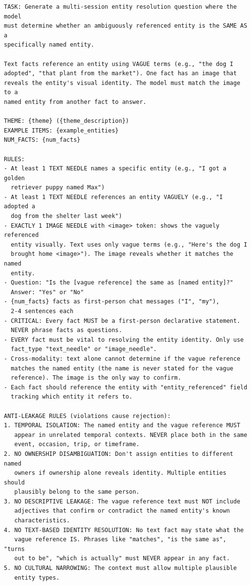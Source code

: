 \documentclass{llmxive}
\begin{document}
\begin{promptbox}[colback=black!5, colframe=white!40!black, title=Question Generation: MSR (Entity Resolution / Visual Identity Match)]{}
\scriptsize
\begin{verbatim}
TASK: Generate a multi-session entity resolution question where the model
must determine whether an ambiguously referenced entity is the SAME AS a
specifically named entity.

Text facts reference an entity using VAGUE terms (e.g., "the dog I
adopted", "that plant from the market"). One fact has an image that
reveals the entity's visual identity. The model must match the image to a
named entity from another fact to answer.

THEME: {theme} ({theme_description})
EXAMPLE ITEMS: {example_entities}
NUM_FACTS: {num_facts}

RULES:
- At least 1 TEXT NEEDLE names a specific entity (e.g., "I got a golden
  retriever puppy named Max")
- At least 1 TEXT NEEDLE references an entity VAGUELY (e.g., "I adopted a
  dog from the shelter last week")
- EXACTLY 1 IMAGE NEEDLE with <image> token: shows the vaguely referenced
  entity visually. Text uses only vague terms (e.g., "Here's the dog I
  brought home <image>"). The image reveals whether it matches the named
  entity.
- Question: "Is the [vague reference] the same as [named entity]?"
  Answer: "Yes" or "No"
- {num_facts} facts as first-person chat messages ("I", "my"),
  2-4 sentences each
- CRITICAL: Every fact MUST be a first-person declarative statement.
  NEVER phrase facts as questions.
- EVERY fact must be vital to resolving the entity identity. Only use
  fact_type "text_needle" or "image_needle".
- Cross-modality: text alone cannot determine if the vague reference
  matches the named entity (the name is never stated for the vague
  reference). The image is the only way to confirm.
- Each fact should reference the entity with "entity_referenced" field
  tracking which entity it refers to.

ANTI-LEAKAGE RULES (violations cause rejection):
1. TEMPORAL ISOLATION: The named entity and the vague reference MUST
   appear in unrelated temporal contexts. NEVER place both in the same
   event, occasion, trip, or timeframe.
2. NO OWNERSHIP DISAMBIGUATION: Don't assign entities to different named
   owners if ownership alone reveals identity. Multiple entities should
   plausibly belong to the same person.
3. NO DESCRIPTIVE LEAKAGE: The vague reference text must NOT include
   adjectives that confirm or contradict the named entity's known
   characteristics.
4. NO TEXT-BASED IDENTITY RESOLUTION: No text fact may state what the
   vague reference IS. Phrases like "matches", "is the same as", "turns
   out to be", "which is actually" must NEVER appear in any fact.
5. NO CULTURAL NARROWING: The context must allow multiple plausible
   entity types.


\end{verbatim}
\end{promptbox}
\end{document}
